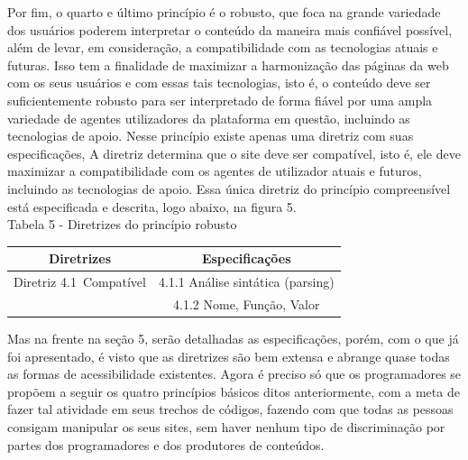 \documentclass[a4paper]{article}
\begin{document}
\begin{titlepage}
Por fim, o quarto e último princípio é o robusto, que foca na grande variedade dos usuários poderem interpretar o conteúdo da maneira mais confiável possível, além de levar, em consideração, a compatibilidade com as tecnologias atuais e futuras. Isso tem a finalidade de maximizar a harmonização das páginas da web com os seus usuários e com essas tais tecnologias, isto é, o conteúdo deve ser suficientemente robusto para ser interpretado de forma fiável por uma ampla variedade de agentes utilizadores da plataforma em questão, incluindo as tecnologias de apoio. Nesse princípio existe apenas uma diretriz com suas especificações, A diretriz determina que o site deve ser compatível, isto é, ele deve maximizar a compatibilidade com os agentes de utilizador atuais e futuros, incluindo as tecnologias de apoio. Essa única diretriz do princípio compreensível está especificada e descrita, logo abaixo, na figura 5.\\

Tabela 5 - Diretrizes do princípio robusto\\[-0.7cm]
\begin{center}
	\fontsize{8pt}{8pt}\selectfont
	\begin{tabular}{|cc|}
		\hline
		Diretrizes & Especificações \\
		\hline
		Diretriz 4.1 Compatível& 4.1.1 Análise sintática (parsing)\\
		& 4.1.2 Nome, Função, Valor\\
		\hline
	\end{tabular}
\end{center}

Mas na frente na seção 5, serão detalhadas as especificações, porém, com o que já foi apresentado, é visto que as diretrizes são bem extensa e abrange quase todas as formas de acessibilidade existentes. Agora é preciso só que os programadores se propõem a seguir os quatro princípios básicos ditos anteriormente, com a meta de fazer tal atividade em seus trechos de códigos, fazendo com que todas as pessoas consigam manipular os seus sites, sem haver nenhum tipo de discriminação por partes dos programadores e dos produtores de conteúdos.


\end{titlepage}
\end{document}
